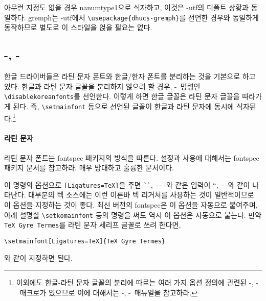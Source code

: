 \documentclass[
	12pt,
	a4paper,
	kosection,
	footnote,
	nobookmarks,
	microtype,
]{oblivoir}
\def\cs#1{\texttt{\textbackslash #1}}
\def\ct#1{\texttt{#1}}
\def\xetexko{\XeTeX-\ko}
\def\luatexko{\LuaTeX-\ko}
\begin{document}
아무런 지정도 없을 경우 nanumtype1으로 식자하고, 이것은 \koTeX-utf의 디폴트 상황과 동일하다.
gremph는 \koTeX-utf에서 \verb|\usepackage{dhucs-gremph}|를 선언한 경우와 동일하게
동작하므로 별도로 이 스타일을 얹을 필요는 없다.

\subsection{\XeTeX-\ko, \LuaTeX-\ko}

한글 드라이버들은 라틴 문자 폰트와 한글/한자 폰트를 분리하는 것을 기본으로 하고 있다.
한글과 라틴 문자 글꼴을 분리하지 않으려 할 경우, 
\xetexko\ 명령인
\verb|\disablekoreanfonts|를 선언한다.
이렇게 하면 한글 글꼴은
라틴 문자 글꼴을 따라가게 된다. 즉, \texttt{\textbackslash setmainfont}
등으로 선언된 글꼴이 한글과 라틴 문자에 동시에 식자된다.\footnote{%
 이외에도 한글-라틴 문자 글꼴의 분리에 따르는 여러 가지 옵션 정의에 관련된
 \xetexko, \luatexko\ 매크로가 있으므로 이에 대해서는 \xetexko, \luatexko\ 매뉴얼을
 참고하라.
}

\paragraph{라틴 문자}
라틴 문자 폰트는 fontspec 패키지의 방식을 따른다.
설정과 사용에 대해서는 fontspec 패키지 문서를 참고하라.
매우 방대하고 훌륭한 문서이다.

\begin{boxedverbatim}
\setmainfont{<Font Name>}
\setsansfont{...}
\setmonofont{...}
\end{boxedverbatim}

이 명령의 옵션으로 \verb|[Ligatures=TeX]|을 주면 \verb|``|, \verb|---|와 같은 
입력이 ``, ---와 같이 나타난다. 대부분의 텍 소스에는 이런 이른바 텍 리거쳐를 사용하는 것이
일반적이므로 이 옵션을 지정하는 것이 좋다. 최신 버전의 fontspec은 이 옵션을 자동으로 붙여주며,
아래 설명할 \cs{setkomainfont} 등의 명령을 써도 역시 이 옵션은 자동으로 붙는다.
만약 \ct{TeX Gyre Termes}를 라틴 문자 세리프 글꼴로 쓰려 한다면,
\begin{verbatim}
\setmainfont[Ligatures=TeX]{TeX Gyre Termes}
\end{verbatim}
와 같이 지정하면 된다.
\end{document}
